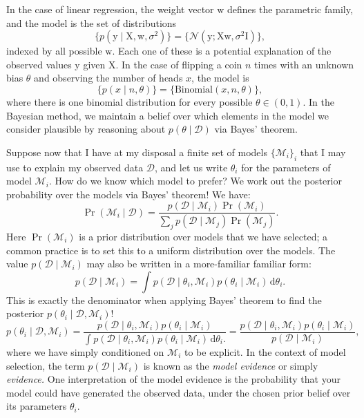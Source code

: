 \documentclass{article}
\newcommand{\given}{\mid}
\newcommand{\mc}[1]{\mathcal{#1}}
\newcommand{\data}{\mc{D}}
\newcommand{\model}{\mc{M}}
\newcommand{\intd}[1]{\,\mathrm{d}{#1}}
\newcommand{\mat}[1]{\bm{\mathrm{#1}}}
\renewcommand{\vec}[1]{\bm{\mathrm{#1}}}
\begin{document}
In the case of linear regression, the weight vector $\vec{w}$ defines
the parametric family, and the model is the set of distributions
\begin{equation*}
  \bigl\{ p(\vec{y} \given \mat{X}, \vec{w}, \sigma^2) \bigr\}
  =
  \bigl\{ \mc{N}(\vec{y}; \mat{X}\vec{w}, \sigma^2 \mat{I}) \bigr\},
\end{equation*}
indexed by all possible $\vec{w}$.  Each one of these is a potential
explanation of the observed values $\vec{y}$ given $\vec{X}$.  In the
case of flipping a coin $n$ times with an unknown bias $\theta$ and
observing the number of heads $x$, the model is
\begin{equation*}
  \bigl\{ p(x \given n, \theta) \bigr\}
  =
  \bigl\{ \mathrm{Binomial}(x, n, \theta) \bigr\},
\end{equation*}
where there is one binomial distribution for every possible $\theta
\in (0, 1)$.  In the Bayesian method, we maintain a belief over which
elements in the model we consider plausible by reasoning about
$p(\theta \given \data)$ via Bayes' theorem.

Suppose now that I have at my disposal a finite set of models
$\{\model_i\}_i$ that I may use to explain my observed data $\data$,
and let us write $\theta_i$ for the parameters of model $\model_i$.
How do we know which model to prefer?  We work out the posterior
probability over the models via Bayes' theorem!  We have:
\begin{equation*}
  \Pr(\model_i \given \data)
  =
  \frac{p(\data \given \model_i)\Pr(\model_i)}
       {\sum_j p(\data \given \model_j)\Pr(\model_j)}.
\end{equation*}
Here $\Pr(\model_i)$ is a prior distribution over models that we have
selected; a common practice is to set this to a uniform distribution
over the models.  The value $p(\data \given \model_i)$ may also be
written in a more-familiar familiar form:
\begin{equation*}
  p(\data \given \model_i)
  =
  \int
  p(\data \given \theta_i, \model_i)
  p(\theta_i \given \model_i)
  \intd{\theta_i}.
\end{equation*}
This is exactly the denominator when applying Bayes' theorem to find
the posterior $p(\theta_i \given \data, \model_i)$!
\begin{equation*}
  p(\theta_i \given \data, \model_i)
  =
  \frac{p(\data \given \theta_i, \model_i) p(\theta_i \given \model_i)}
       {\int
         p(\data \given \theta_i, \model_i)
         p(\theta_i \given \model_i)
         \intd{\theta_i}.
       }
  =
  \frac{p(\data \given \theta_i, \model_i) p(\theta_i \given \model_i)}
       {p(\data \given \model_i)},
\end{equation*}
where we have simply conditioned on $\model_i$ to be explicit.  In the
context of model selection, the term $p(\data \given \model_i)$ is
known as the \emph{model evidence} or simply \emph{evidence.}  One
interpretation of the model evidence is the probability that your
model could have generated the observed data, under the chosen prior
belief over its parameters $\theta_i$.
\end{document}
